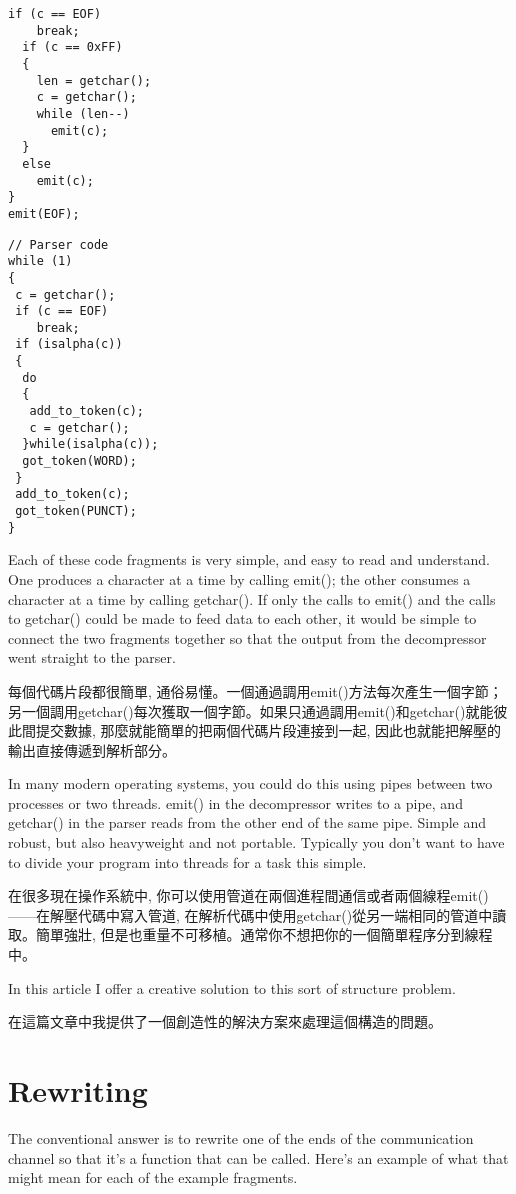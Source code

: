 \documentclass[12pt]{article}
\begin{document}
\begin{CJK}{UTF8}{bsmi}
\begin{multicols}{2}
\begin{lstlisting}[caption=decompression, basicstyle=\footnotesize, breaklines=true, frame=single,frameround=tttt]
  if (c == EOF)
    break;
  if (c == 0xFF) 
  {
    len = getchar();
    c = getchar();
    while (len--)
      emit(c);
  } 
  else
    emit(c);
}
emit(EOF);
\end{lstlisting}

\begin{lstlisting}[caption=parser, basicstyle=\footnotesize, breaklines=true, frame=single,frameround=tttt]
// Parser code 
while (1) 
{
 c = getchar();
 if (c == EOF)
    break;
 if (isalpha(c)) 
 {
  do 
  {
   add_to_token(c);
   c = getchar();
  }while(isalpha(c));
  got_token(WORD);
 }
 add_to_token(c);
 got_token(PUNCT);
}

\end{lstlisting}
\end{multicols}

 Each of these code fragments is very simple, and easy to read and understand. One produces a character at a time by calling emit(); the other consumes a character at a time by calling getchar(). If only the calls to emit() and the calls to getchar() could be made to feed data to each other, it would be simple to connect the two fragments together so that the output from the decompressor went straight to the parser.

每個代碼片段都很簡單, 通俗易懂。一個通過調用emit()方法每次產生一個字節；另一個調用getchar()每次獲取一個字節。如果只通過調用emit()和getchar()就能彼此間提交數據, 那麼就能簡單的把兩個代碼片段連接到一起, 因此也就能把解壓的輸出直接傳遞到解析部分。

 In many modern operating systems, you could do this using pipes between two processes or two threads. emit() in the decompressor writes to a pipe, and getchar() in the parser reads from the other end of the same pipe. Simple and robust, but also heavyweight and not portable. Typically you don't want to have to divide your program into threads for a task this simple.

在很多現在操作系統中, 你可以使用管道在兩個進程間通信或者兩個線程emit()——在解壓代碼中寫入管道, 在解析代碼中使用getchar()從另一端相同的管道中讀取。簡單強壯, 但是也重量不可移植。通常你不想把你的一個簡單程序分到線程中。

In this article I offer a creative solution to this sort of structure problem. 

在這篇文章中我提供了一個創造性的解決方案來處理這個構造的問題。 

\section{Rewriting}
 The conventional answer is to rewrite one of the ends of the communication channel so that it's a function that can be called. Here's an example of what that might mean for each of the example fragments.


\end{CJK}
\end{document}
